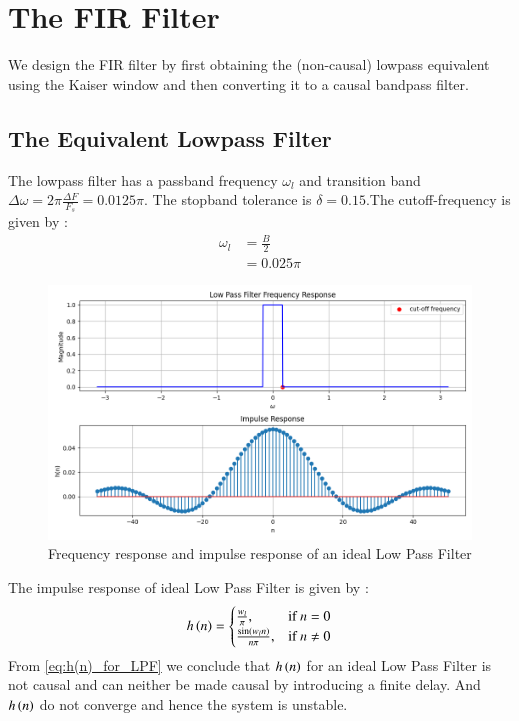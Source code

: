 \documentclass{article}
\begin{document}
\section{The FIR Filter}
We design the FIR filter by first obtaining the (non-causal) lowpass equivalent using the Kaiser window
and then
converting it to a causal bandpass filter.
\subsection{The Equivalent Lowpass Filter}
The lowpass filter has a passband frequency $\omega_l$ and transition band $\Delta \omega = 2\pi \frac{\Delta F}{F_s} = 0.0125\pi$.
The stopband tolerance is $\delta=0.15$.The cutoff-frequency is given by :
\begin{align}
    \omega_{l} &= \frac{B}{2}\\
                &= 0.025\pi
\end{align}
\begin{figure}[H]
\centering
\includegraphics[width=1\columnwidth]{figs/LPF_FIR.png}
\caption{Frequency response and impulse response of an ideal Low Pass Filter}
\label{fig:LPF_FIR_1}
\end{figure}

The impulse response of ideal Low Pass Filter is given by :
\begin{align}
    h\left(n\right) = 
\begin{cases} 
    \frac{w_l}{\pi}, & \text{if } n = 0 \\
    \frac{\sin(w_l n)}{n\pi}, & \text{if } n \neq 0
\end{cases} \label{eq:h(n)_for_LPF}
\end{align}
From \eqref{eq:h(n)_for_LPF} we conclude that $h\left(n\right)$ for an ideal Low Pass Filter is not causal and can neither be made causal by introducing a finite delay. And $h\left(n\right)$ do not converge and hence the system is unstable.
\end{document}
